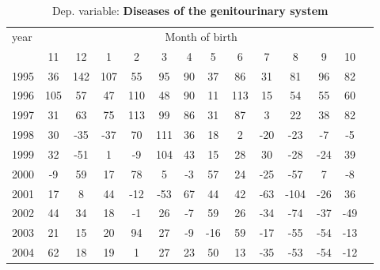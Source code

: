  \begin{table}[H] \begin{threeparttable} \centering \caption{Dep. variable: \textbf{Diseases of the genitourinary system}} {\def\sym#1{\ifmmode^{#1}\else\(^{#1}\)\fi} \begin{tabular}{l*{13}{c}} \toprule year & \multicolumn{12}{c}{Month of birth} \\ \cmidrule(lr){2-13} 
            &          11&          12&           1&           2&           3&           4&           5&           6&           7&           8&           9&          10\\
1995        &          36&         142&         107&          55&          95&          90&          37&          86&          31&          81&          96&          82\\
1996        &         105&          57&          47&         110&          48&          90&          11&         113&          15&          54&          55&          60\\
1997        &          31&          63&          75&         113&          99&          86&          31&          87&           3&          22&          38&          82\\
1998        &          30&         -35&         -37&          70&         111&          36&          18&           2&         -20&         -23&          -7&          -5\\
1999        &          32&         -51&           1&          -9&         104&          43&          15&          28&          30&         -28&         -24&          39\\
2000        &          -9&          59&          17&          78&           5&          -3&          57&          24&         -25&         -57&           7&          -8\\
2001        &          17&           8&          44&         -12&         -53&          67&          44&          42&         -63&        -104&         -26&          36\\
2002        &          44&          34&          18&          -1&          26&          -7&          59&          26&         -34&         -74&         -37&         -49\\
2003        &          21&          15&          20&          94&          27&          -9&         -16&          59&         -17&         -55&         -54&         -13\\
2004        &          62&          18&          19&           1&          27&          23&          50&          13&         -35&         -53&         -54&         -12\\

\end{tabular}}
\end{threeparttable}
\end{table}
